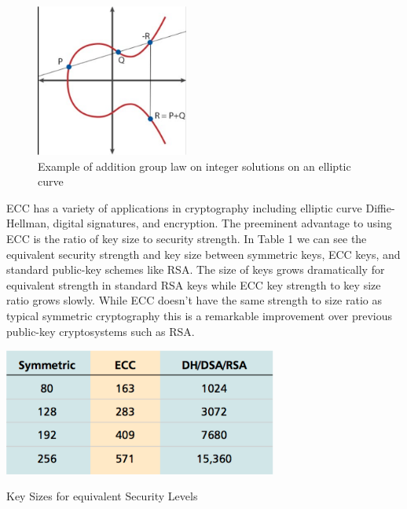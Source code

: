  \begin{figure}[t]
	\centering
	\includegraphics[width=5cm,height=0.5\textheight,keepaspectratio]{./figures/figure_1}
	\caption[font=footnote]{Example of addition group law on integer solutions on an elliptic curve}
\end{figure}

ECC has a variety of applications in cryptography including elliptic curve Diffie-Hellman, digital signatures, and encryption. The preeminent advantage to using ECC is the ratio of key size to security strength. In Table 1 we can see the equivalent security strength and key size between symmetric keys, ECC keys,  and standard public-key schemes like RSA. The size of keys grows dramatically for equivalent strength in standard RSA keys while ECC key strength to key size ratio grows slowly. While ECC doesn't have the same strength to size ratio as typical symmetric cryptography this is a remarkable improvement over previous public-key cryptosystems such as RSA.

 \begin{table}[t]
	\centering
	\includegraphics[width=9cm,height=0.5\textheight,keepaspectratio]{./figures/table_1}
	\center\caption[font=footnote]{Key Sizes for equivalent Security Levels}
\end{table}
	
